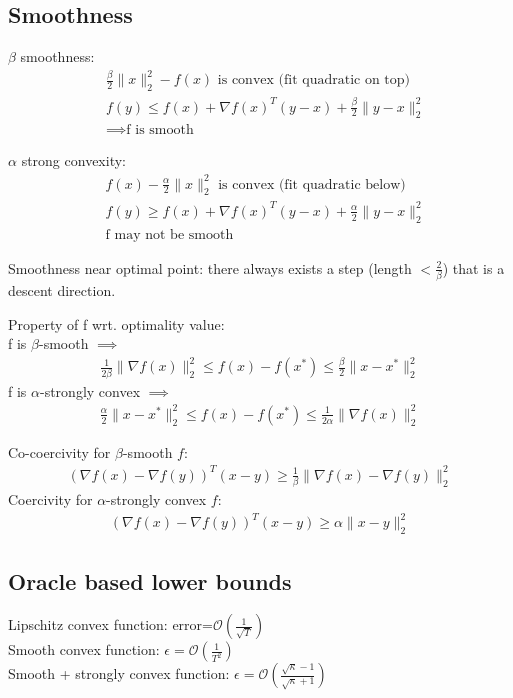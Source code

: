 \documentclass[8pt,letter]{article}
\begin{document}
\begin{multicols*}{2}
  \vfill\null
  \columnbreak
    
  \section{Smoothness}
  $\beta$ smoothness:
  \begin{align*}
    & \frac{\beta}{2} \|x\|_2^2 - f(x) \text{ is convex (fit quadratic on top)}\\
    & f(y) \leq f(x) + \nabla f(x)^T (y-x) + \frac{\beta}{2} \|y-x\|_2^2\\
    & \implies \text{f is smooth}
  \end{align*}

  $\alpha$ strong convexity:
  \begin{align*}
    & f(x) - \frac{\alpha}{2} \|x\|_2^2 \text{ is convex (fit quadratic below)}\\
    & f(y) \geq f(x) + \nabla f(x)^T (y-x) + \frac{\alpha}{2} \|y-x\|_2^2\\
    & \text{f may not be smooth}
  \end{align*}

  Smoothness near optimal point: there always exists a step (length $<\frac{2}{\beta}$) that is a descent direction.

  Property of f wrt. optimality value:\\
  f is $\beta$-smooth $\implies$
  \begin{align*}
    \frac{1}{2 \beta} \|\nabla f(x) \|_2^2 \leq f(x) -f(x^*) \leq \frac{\beta}{2} \| x-x^* \|_2^2
  \end{align*}
  f is $\alpha$-strongly convex $\implies$
  \begin{align*}
    \frac{\alpha}{2} \| x-x^* \|_2^2 \leq f(x) -f(x^*) \leq \frac{1}{2 \alpha} \|\nabla f(x) \|_2^2
  \end{align*}

  Co-coercivity for $\beta$-smooth $f$:
  \begin{align*}
    \left(\nabla f(x) - \nabla f(y)\right)^T(x-y) \geq \frac{1}{\beta} \|\nabla f(x) - \nabla f(y)\|_2^2
  \end{align*}
  Coercivity for $\alpha$-strongly convex $f$:
  \begin{align*}
    \left(\nabla f(x) - \nabla f(y)\right)^T(x-y) \geq \alpha \|x - y\|_2^2
  \end{align*}
  
  \subsection {Oracle based lower bounds}
  Lipschitz convex function: error=$\mathcal{O}(\frac{1}{\sqrt{T}})$\\
  Smooth convex function: $\epsilon=\mathcal{O}(\frac{1}{T^2})$\\
  Smooth + strongly convex function: $\epsilon=\mathcal{O}(\frac{\sqrt{\kappa}-1}{\sqrt{\kappa}+1})$


\end{multicols*}
\end{document}
